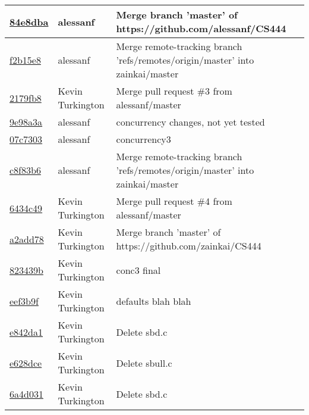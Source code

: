 \begin{tabular}{l l l}
\href{https://github.com/zainkai/CS444/commit/84e8dbaa2bb41903b99d0541490d3b34dc2dabea}{84e8dba} & alessanf & Merge branch 'master' of https://github.com/alessanf/CS444\\\hline
\href{https://github.com/zainkai/CS444/commit/f2b15e83f9cb7c13152067b7b048fbfa8ca9c610}{f2b15e8} & alessanf & Merge remote-tracking branch 'refs/remotes/origin/master' into zainkai/master\\\hline
\href{https://github.com/zainkai/CS444/commit/2179fb8dc4621a3032634abf60185135ab19f5ae}{2179fb8} & Kevin Turkington & Merge pull request \#3 from alessanf/master\\\hline
\href{https://github.com/zainkai/CS444/commit/9e98a3ac066f06665e03a533697abd42e550fb2f}{9e98a3a} & alessanf & concurrency changes, not yet tested\\\hline
\href{https://github.com/zainkai/CS444/commit/07c73034dd65c9e3a6fc66a623a206ad23683823}{07c7303} & alessanf & concurrency3\\\hline
\href{https://github.com/zainkai/CS444/commit/c8f83b6e1cf43d32085f6371b665d0d573808501}{c8f83b6} & alessanf & Merge remote-tracking branch 'refs/remotes/origin/master' into zainkai/master\\\hline
\href{https://github.com/zainkai/CS444/commit/6434c4946005af9ff97065f15c5d018a19c8d3cc}{6434c49} & Kevin Turkington & Merge pull request \#4 from alessanf/master\\\hline
\href{https://github.com/zainkai/CS444/commit/a2add7836ea000d471ccfb438ecb88b5184cdd89}{a2add78} & Kevin Turkington & Merge branch 'master' of https://github.com/zainkai/CS444\\\hline
\href{https://github.com/zainkai/CS444/commit/823439be0270f86635be790d8c7fc44e7c7a9736}{823439b} & Kevin Turkington & conc3 final\\\hline
\href{https://github.com/zainkai/CS444/commit/eef3b9f809ff22a915b032dcd97a480609d2ac0f}{eef3b9f} & Kevin Turkington & defaults blah blah\\\hline
\href{https://github.com/zainkai/CS444/commit/e842da161fb450acd0479191b07e836c2ffa9a47}{e842da1} & Kevin Turkington & Delete sbd.c\\\hline
\href{https://github.com/zainkai/CS444/commit/e628dce7300c7fd5dcea8336688b38ebf154d7a8}{e628dce} & Kevin Turkington & Delete sbull.c\\\hline
\href{https://github.com/zainkai/CS444/commit/6a4d0316f275c8c1fa5c0ff823a93ccaf80b1561}{6a4d031} & Kevin Turkington & Delete sbd.c\\\hline

\end{tabular}

